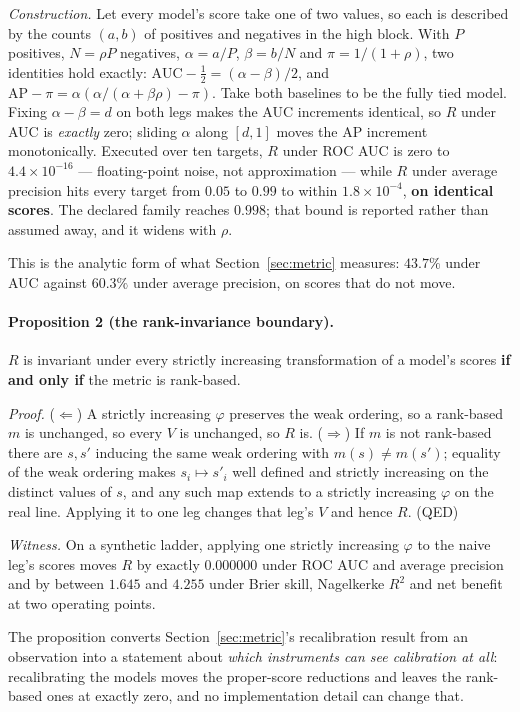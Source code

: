 \documentclass[preprint,12pt]{elsarticle}
\begin{document}
\emph{Construction.} Let every model's score take one of two values, so each
is described by the counts $(a,b)$ of positives and negatives in the high
block. With $P$ positives, $N = \rho P$ negatives, $\alpha = a/P$,
$\beta = b/N$ and $\pi = 1/(1+\rho)$, two identities hold exactly:
$\mathrm{AUC} - \tfrac12 = (\alpha - \beta)/2$, and
$\mathrm{AP} - \pi = \alpha\left(\alpha/(\alpha + \beta\rho) - \pi\right)$.
Take both baselines to be the fully tied model. Fixing $\alpha - \beta = d$ on
both legs makes the AUC increments identical, so $R$ under AUC is
\emph{exactly} zero; sliding $\alpha$ along $[d,1]$ moves the AP increment
monotonically. Executed over ten targets, $R$ under ROC AUC is zero to
$4.4 \times 10^{-16}$ --- floating-point noise, not approximation --- while
$R$ under average precision hits every target from $0.05$ to $0.99$ to within
$1.8 \times 10^{-4}$, \textbf{on identical scores}. The declared family
reaches $0.998$; that bound is reported rather than assumed away, and it
widens with $\rho$.

This is the analytic form of what Section~\ref{sec:metric} measures: $43.7\%$
under AUC against $60.3\%$ under average precision, on scores that do not
move.

\paragraph{Proposition 2 (the rank-invariance boundary).} $R$ is invariant
under every strictly increasing transformation of a model's scores
\textbf{if and only if} the metric is rank-based.

\emph{Proof.} ($\Leftarrow$) A strictly increasing $\varphi$ preserves the
weak ordering, so a rank-based $m$ is unchanged, so every $V$ is unchanged,
so $R$ is. ($\Rightarrow$) If $m$ is not rank-based there are $s, s'$ inducing
the same weak ordering with $m(s) \neq m(s')$; equality of the weak ordering
makes $s_i \mapsto s'_i$ well defined and strictly increasing on the distinct
values of $s$, and any such map extends to a strictly increasing $\varphi$ on the
real line. Applying it to one leg changes that leg's $V$ and hence $R$.
\hfill (QED)

\emph{Witness.} On a synthetic ladder, applying one strictly increasing
$\varphi$ to the naive leg's scores moves $R$ by exactly $0.000000$ under ROC
AUC and average precision and by between $1.645$ and $4.255$ under Brier
skill, Nagelkerke $R^2$ and net benefit at two operating points.

The proposition converts Section~\ref{sec:metric}'s recalibration result from
an observation into a statement about \emph{which instruments can see
calibration at all}: recalibrating the models moves the proper-score
reductions and leaves the rank-based ones at exactly zero, and no
implementation detail can change that.
\end{document}
